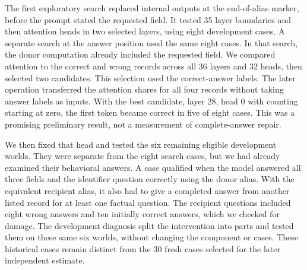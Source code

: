 \documentclass[10pt,letterpaper]{article}
\begin{document}
The first exploratory search replaced internal outputs at the end-of-alias marker, before the prompt stated the requested field. It tested 35 layer boundaries and then attention heads in two selected layers, using eight development cases. A separate search at the answer position used the same eight cases. In that search, the donor computation already included the requested field. We compared attention to the correct and wrong records across all 36 layers and 32 heads, then selected two candidates. This selection used the correct-answer labels. The later operation transferred the attention shares for all four records without taking answer labels as inputs. With the best candidate, layer 28, head 0 with counting starting at zero, the first token became correct in five of eight cases. This was a promising preliminary result, not a measurement of complete-answer repair.


We then fixed that head and tested the six remaining eligible development worlds. They were separate from the eight search cases, but we had already examined their behavioral answers. A case qualified when the model answered all three fields and the identifier question correctly using the donor alias. With the equivalent recipient alias, it also had to give a completed answer from another listed record for at least one factual question. The recipient questions included eight wrong answers and ten initially correct answers, which we checked for damage. The development diagnosis split the intervention into parts and tested them on these same six worlds, without changing the component or cases. These historical cases remain distinct from the 30 fresh cases selected for the later independent estimate.
\end{document}
